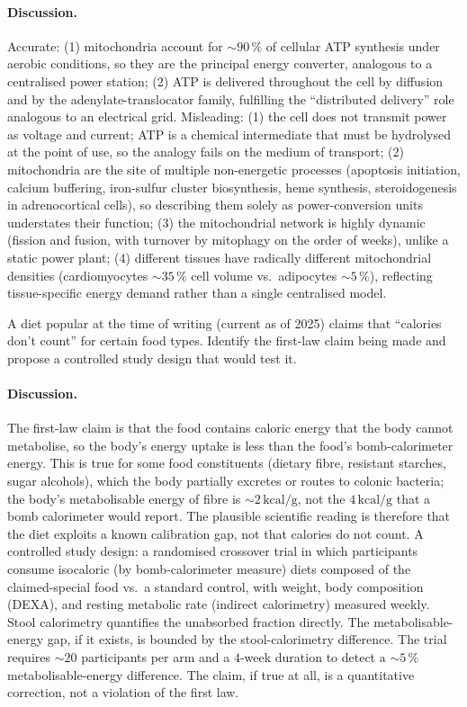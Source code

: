 \paragraph{Discussion.}
Accurate: (1) mitochondria account for $\sim 90\,\%$ of cellular ATP
synthesis under aerobic conditions, so they are the principal energy
converter, analogous to a centralised power station; (2) ATP is
delivered throughout the cell by diffusion and by the
adenylate-translocator family, fulfilling the ``distributed delivery''
role analogous to an electrical grid. Misleading: (1) the cell does
not transmit power as voltage and current; ATP is a chemical
intermediate that must be hydrolysed at the point of use, so the
analogy fails on the medium of transport; (2) mitochondria are the
site of multiple non-energetic processes (apoptosis initiation,
calcium buffering, iron-sulfur cluster biosynthesis, heme synthesis,
steroidogenesis in adrenocortical cells), so describing them solely
as power-conversion units understates their function; (3) the
mitochondrial network is highly dynamic (fission and fusion, with
turnover by mitophagy on the order of weeks), unlike a static power
plant; (4) different tissues have radically different mitochondrial
densities (cardiomyocytes $\sim 35\,\%$ cell volume vs.\ adipocytes
$\sim 5\,\%$), reflecting tissue-specific energy demand rather than a
single centralised model.

\begin{exercise}
A diet popular at the time of writing (current as of 2025) claims
that ``calories don't count'' for certain food types. Identify the
first-law claim being made and propose a controlled study design that
would test it.
\end{exercise}

\paragraph{Discussion.}
The first-law claim is that the food contains caloric energy that
the body cannot metabolise, so the body's energy uptake is less
than the food's bomb-calorimeter energy. This is true for some food
constituents (dietary fibre, resistant starches, sugar alcohols),
which the body partially excretes or routes to colonic bacteria;
the body's metabolisable energy of fibre is $\sim 2\,\text{kcal/g}$,
not the $4\,\text{kcal/g}$ that a bomb calorimeter would report. The
plausible scientific reading is therefore that the diet exploits a
known calibration gap, not that calories do not count. A controlled
study design: a randomised crossover trial in which participants
consume isocaloric (by bomb-calorimeter measure) diets composed of
the claimed-special food vs.\ a standard control, with weight, body
composition (DEXA), and resting metabolic rate (indirect calorimetry)
measured weekly. Stool calorimetry quantifies the unabsorbed fraction
directly. The metabolisable-energy gap, if it exists, is bounded by
the stool-calorimetry difference. The trial requires $\sim 20$
participants per arm and a $4$-week duration to detect a $\sim 5\,\%$
metabolisable-energy difference. The claim, if true at all, is a
quantitative correction, not a violation of the first law.

